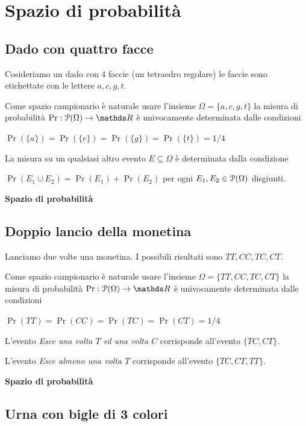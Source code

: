 \documentclass[11pt,openany]{book}
\def\RR{\mathds R}
\def\P{\EuScript P}
\begin{document}
\clearpage\section{Spazio di probabilità}

\subsection{Dado con quattro facce}
\label{tetraedro}

Cosideriamo un dado con $4$ faccie (un tetraedro regolare) le faccie sono etichettate con le lettere $a, c, g, t$. 

Come spazio campionario è naturale usare l'insieme $\Omega=\{a, c, g, t\}$ la misura di probabilità $\Pr:\P(\Omega)\to\RR$ è univocamente determinata dalle condizioni

$\Pr(\{a\})=\Pr(\{c\})=\Pr(\{g\})=\Pr(\{t\})=1/4$

La misura su un qualsiasi altro evento $E\subseteq\Omega$ è determinata dalla condizione 

$\Pr(E_1\cup E_2)=\Pr(E_1)+\Pr(E_2)$ per ogni $E_1,E_2\in\P(\Omega)$ disgiunti.



\clearpage\hfill\textbf{Spazio di probabilità}
\subsection{Doppio lancio della monetina}
\label{doppo_lancio_moneta}

Lanciamo due volte una monetina. I possibili risultati sono $TT, CC, TC, CT$. 

Come spazio campionario è naturale usare l'insieme $\Omega=\{TT, CC, TC, CT\}$ la misura di probabilità $\Pr:\P(\Omega)\to\RR$ è univocamente determinata dalle condizioni

$\Pr(TT)=\Pr(CC)=\Pr(TC)=\Pr(CT)=1/4$

L'evento \textit{Esce una volta $T$ ed una volta $C$\/} corrisponde all'evento $\{TC, CT\}$.

L'evento \textit{Esce almeno una volta $T$\/} corrisponde all'evento $\{TC, CT, TT\}$.



\clearpage\hfill\textbf{Spazio di probabilità}
\subsection{Urna con bigle di 3 colori}
\label{urna_3_colori}
\end{document}
